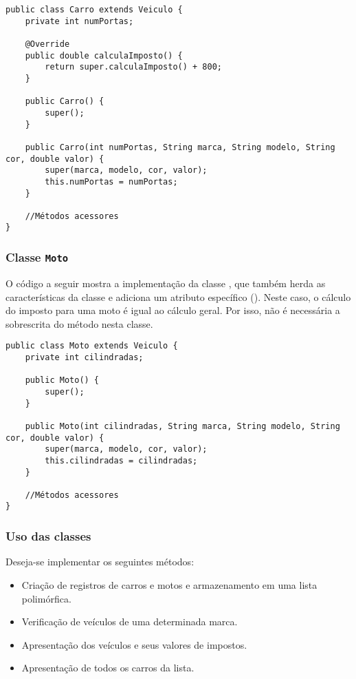 \begin{verbatim}
public class Carro extends Veiculo {
	private int numPortas;

	@Override
	public double calculaImposto() {
		return super.calculaImposto() + 800;
	}

	public Carro() {
		super();
	}

	public Carro(int numPortas, String marca, String modelo, String cor, double valor) {
		super(marca, modelo, cor, valor);
		this.numPortas = numPortas;
	}

	//Métodos acessores
}
\end{verbatim}

\subsubsection{Classe \texttt{Moto}}

O código a seguir mostra a implementação da classe , que também herda as características da classe  e adiciona um atributo específico (). Neste caso, o cálculo do imposto para uma moto é igual ao cálculo geral. Por isso, não é necessária a sobrescrita do método  nesta classe.

\begin{verbatim}
public class Moto extends Veiculo {
	private int cilindradas;

	public Moto() {
		super();
	}

	public Moto(int cilindradas, String marca, String modelo, String cor, double valor) {
		super(marca, modelo, cor, valor);
		this.cilindradas = cilindradas;
	}

	//Métodos acessores
}
\end{verbatim}

\subsubsection{Uso das classes}

Deseja-se implementar os seguintes métodos:
\begin{itemize}
	\item Criação de registros de carros e motos e armazenamento em uma lista polimórfica.
	\item Verificação de veículos de uma determinada marca.
	\item Apresentação dos veículos e seus valores de impostos.
	\item Apresentação de todos os carros da lista.
\end{itemize}

